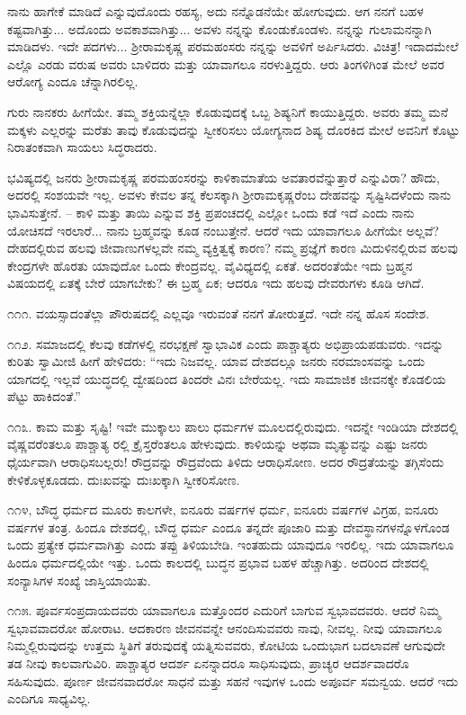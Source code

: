 ನಾನು ಹಾಗೇಕೆ ಮಾಡಿದೆ ಎನ್ನುವುದೊಂದು ರಹಸ್ಯ, ಅದು ನನ್ನೊಡನೆಯೇ ಹೋಗುವುದು. ಆಗ ನನಗೆ ಬಹಳ ಕಷ್ಟವಾಗಿತ್ತು... ಅದೊಂದು ಅವಕಾಶವಾಗಿತ್ತು... ಅವಳು ನನ್ನನ್ನು ಕೊಂಡುಕೊಂಡಳು. ನನ್ನನ್ನು ಗುಲಾಮನನ್ನಾಗಿ ಮಾಡಿದಳು. ಇದೇ ಪದಗಳು... ಶ‍್ರೀರಾಮಕೃಷ್ಣ ಪರಮಹಂಸರು ನನ್ನನ್ನು ಅವಳಿಗೆ ಅರ್ಪಿಸಿದರು. ವಿಚಿತ್ರ! ಇದಾದಮೇಲೆ ಎಲ್ಲೊ ಎರಡು ವರುಷ ಅವರು ಬಾಳಿದರು ಮತ್ತು ಯಾವಾಗಲೂ ನರಳುತ್ತಿದ್ದರು. ಆರು ತಿಂಗಳಿಗಿಂತ ಮೇಲೆ ಅವರ ಆರೋಗ್ಯ ಎಂದೂ ಚೆನ್ನಾಗಿರಲಿಲ್ಲ.

ಗುರು ನಾನಕರು ಹೀಗೆಯೇ. ತಮ್ಮ ಶಕ್ತಿಯನ್ನೆಲ್ಲಾ ಕೊಡುವುದಕ್ಕೆ ಒಬ್ಬ ಶಿಷ್ಯನಿಗೆ ಕಾಯುತ್ತಿದ್ದರು. ಅವರು ತಮ್ಮ ಮನೆ ಮಕ್ಕಳು ಎಲ್ಲರನ್ನು ಮರೆತು ತಾವು ಕೊಡುವುದನ್ನು ಸ್ವೀಕರಿಸಲು ಯೋಗ್ಯನಾದ ಶಿಷ್ಯ ದೊರಕಿದ ಮೇಲೆ ಅವನಿಗೆ ಕೊಟ್ಟು ನಿರಾತಂಕವಾಗಿ ಸಾಯಲು ಸಿದ್ಧರಾದರು.

ಭವಿಷ್ಯದಲ್ಲಿ ಜನರು ಶ‍್ರೀರಾಮಕೃಷ್ಣ ಪರಮಹಂಸರನ್ನು ಕಾಳಿಕಾಮಾತೆಯ ಅವತಾರವೆನ್ನುತ್ತಾರೆ ಎನ್ನುವಿರಾ? ಹೌದು, ಅದರಲ್ಲಿ ಸಂಶಯವೇ ಇಲ್ಲ. ಅವಳು ಕೇವಲ ತನ್ನ ಕೆಲಸಕ್ಕಾಗಿ ಶ‍್ರೀರಾಮಕೃಷ್ಣರೆಂಬ ದೇಹವನ್ನು ಸೃಷ್ಟಿಸಿದಳೆಂದು ನಾನು ಭಾವಿಸುತ್ತೇನೆ. – ಕಾಳಿ ಮತ್ತು ತಾಯಿ ಎನ್ನುವ ಶಕ್ತಿ ಪ್ರಪಂಚದಲ್ಲಿ ಎಲ್ಲೋ ಒಂದು ಕಡೆ ಇದೆ ಎಂದು ನಾನು ಯೋಚಿಸದೆ ಇರಲಾರೆ... ನಾನು ಬ್ರಹ್ಮವನ್ನು ಕೂಡ ನಂಬುತ್ತೇನೆ. ಆದರೆ ಇದು ಯಾವಾಗಲೂ ಹೀಗೆಯೇ ಅಲ್ಲವೆ? ದೇಹದಲ್ಲಿರುವ ಹಲವು ಜೀವಾಣುಗಳಲ್ಲವೇ ನಮ್ಮ ವ್ಯಕ್ತಿತ್ವಕ್ಕೆ ಕಾರಣ? ನಮ್ಮ ಪ್ರಜ್ಞೆಗೆ ಕಾರಣ ಮಿದುಳಿನಲ್ಲಿರುವ ಹಲವು ಕೇಂದ್ರಗಳೇ ಹೊರತು ಯಾವುದೋ ಒಂದು ಕೇಂದ್ರವಲ್ಲ. ವೈವಿಧ್ಯದಲ್ಲಿ ಏಕತೆ. ಅದರಂತೆಯೇ ಇದು ಬ್ರಹ್ಮನ ವಿಷಯದಲ್ಲಿ ಏತಕ್ಕೆ ಬೇರೆ ಯಾಗಬೇಕು? ಈ ಬ್ರಹ್ಮ ಏಕ; ಆದರೂ ಇದು ಹಲವು ದೇವರುಗಳು ಕೂಡಿ ಆಗಿದೆ.

೧೧೧. ವಯಸ್ಸಾದಂತೆಲ್ಲಾ ಪೌರುಷದಲ್ಲಿ ಎಲ್ಲವೂ ಇರುವಂತೆ ನನಗೆ ತೋರುತ್ತದೆ. ಇದೇ ನನ್ನ ಹೊಸ ಸಂದೇಶ.

೧೧೨. ಸಮಾಜದಲ್ಲಿ ಕೆಲವು ಕಡೆಗಳಲ್ಲಿ ನರಭಕ್ಷಣೆ ಸ್ವಾಭಾವಿಕ ಎಂದು ಪಾಶ್ಚಾತ್ಯರು ಅಭಿಪ್ರಾಯಪಡುವರು. ಇದನ್ನು ಕುರಿತು ಸ್ವಾಮೀಜಿ ಹೀಗೆ ಹೇಳಿದರು: “ಇದು ನಿಜವಲ್ಲ. ಯಾವ ದೇಶದಲ್ಲೂ ಜನರು ನರಮಾಂಸವನ್ನು ಒಂದು ಯಾಗದಲ್ಲಿ ಇಲ್ಲವೆ ಯುದ್ಧದಲ್ಲಿ ದ್ವೇಷದಿಂದ ತಿಂದರೇ ವಿನಃ ಬೇರೆಯಲ್ಲ. ಇದು ಸಾಮಾಜಿಕ ಜೀವನಕ್ಕೇ ಕೊಡಲಿಯ ಪೆಟ್ಟು ಹಾಕಿದಂತೆ.”

೧೧೩. ಕಾಮ ಮತ್ತು ಸೃಷ್ಟಿ! ಇವೇ ಮುಕ್ಕಾಲು ಪಾಲು ಧರ್ಮಗಳ ಮೂಲದಲ್ಲಿರುವುದು. ಇದನ್ನೇ ಇಂಡಿಯಾ ದೇಶದಲ್ಲಿ ವೈಷ್ಣವರೆಂತಲೂ ಪಾಶ್ಚಾತ್ಯ ರಲ್ಲಿ ಕ್ರೈಸ್ತರೆಂತಲೂ ಹೇಳುವುದು. ಕಾಳಿಯನ್ನು ಅಥವಾ ಮೃತ್ಯುವನ್ನು ಎಷ್ಟು ಜನರು ಧೈರ್ಯವಾಗಿ ಆರಾಧಿಸಬಲ್ಲರು! ರೌದ್ರವನ್ನು ರೌದ್ರವೆಂದು ತಿಳಿದು ಆರಾಧಿಸೋಣ. ಅದರ ರೌದ್ರತೆಯನ್ನು ತಗ್ಗಿಸೆಂದು ಕೇಳಿಕೊಳ್ಳಕೂಡದು. ದುಃಖವನ್ನು ದುಃಖಕ್ಕಾಗಿ ಸ್ವೀಕರಿಸೋಣ.

೧೧೪, ಬೌದ್ಧ ಧರ್ಮದ ಮೂರು ಕಾಲಗಳೇ, ಐನೂರು ವರ್ಷಗಳ ಧರ್ಮ, ಐನೂರು ವರ್ಷಗಳ ವಿಗ್ರಹ, ಐನೂರು ವರ್ಷಗಳ ತಂತ್ರ. ಹಿಂದೂ ದೇಶದಲ್ಲಿ, ಬೌದ್ಧ ಧರ್ಮ ಎಂದೂ ತನ್ನದೇ ಪೂಜಾರಿ ಮತ್ತು ದೇವಸ್ಥಾನಗಳನ್ನೊಳಗೊಂಡ ಒಂದು ಪ್ರತ್ಯೇಕ ಧರ್ಮವಾಗಿತ್ತು ಎಂದು ತಪ್ಪು ತಿಳಿಯಬೇಡಿ. ಇಂತಹುದು ಯಾವುದೂ ಇರಲಿಲ್ಲ. ಇದು ಯಾವಾಗಲೂ ಹಿಂದೂ ಧರ್ಮದಲ್ಲಿಯೇ ಇತ್ತು. ಒಂದು ಕಾಲದಲ್ಲಿ ಬುದ್ಧನ ಪ್ರಭಾವ ಬಹಳ ಹೆಚ್ಚಾಗಿತ್ತು. ಅದರಿಂದ ದೇಶದಲ್ಲಿ ಸಂನ್ಯಾಸಿಗಳ ಸಂಖ್ಯೆ ಜಾಸ್ತಿಯಾಯಿತು.

೧೧೫. ಪೂರ್ವಸಂಪ್ರದಾಯದವರು ಯಾವಾಗಲೂ ಮತ್ತೊಂದರ ಎದುರಿಗೆ ಬಾಗುವ ಸ್ವಭಾವದವರು. ಆದರೆ ನಿಮ್ಮ ಸ್ವಭಾವವಾದರೋ ಹೋರಾಟ. ಆದಕಾರಣ ಜೀವನವನ್ನೇ ಆನಂದಿಸುವವರು ನಾವು, ನೀವಲ್ಲ. ನೀವು ಯಾವಾಗಲೂ ನಿಮ್ಮಲ್ಲಿರುವುದನ್ನು ಉತ್ತಮ ಸ್ಥಿತಿಗೆ ತರುವುದಕ್ಕೆ ಯತ್ನಿಸುವವರು, ಕೋಟಿಯ ಒಂದುಭಾಗ ಬದಲಾವಣೆ ಆಗುವುದೇ ತಡ ನೀವು ಕಾಲವಾಗುವಿರಿ. ಪಾಶ್ಚಾತ್ಯರ ಆದರ್ಶ ಏನನ್ನಾದರೂ ಸಾಧಿಸುವುದು, ಪ್ರಾಚ್ಯರ ಆದರ್ಶವಾದರೊ ಸಹಿಸುವುದು. ಪೂರ್ಣ ಜೀವನವಾದರೋ ಸಾಧನೆ ಮತ್ತು ಸಹನೆ ಇವುಗಳ ಒಂದು ಅಪೂರ್ವ ಸಮನ್ವಯ. ಆದರೆ ಇದು ಎಂದಿಗೂ ಸಾಧ್ಯವಿಲ್ಲ.

